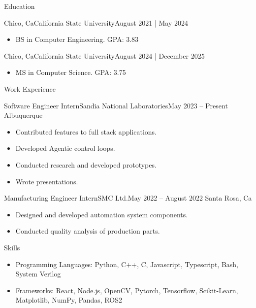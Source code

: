 \documentclass[]{mcdowellcv}
\begin{document}
\makeheader
      

\begin{cvsection}{Education}
	\begin{cvsubsection}{Chico, Ca}{California State University}{August 2021 | May 2024}
		\begin{itemize}
			\item BS in Computer Engineering. GPA: 3.83
		\end{itemize}
	\end{cvsubsection}
	\begin{cvsubsection}{Chico, Ca}{California State University}{August 2024 | December 2025}
		\begin{itemize}
			\item MS in Computer Science. GPA: 3.75
		\end{itemize}
	\end{cvsubsection}
\end{cvsection}
\begin{cvsection}{Work Experience}
	\begin{cvsubsection}{Software Engineer Intern}{Sandia National Laboratories}{May 2023 -- Present}
		Albuquerque
		\begin{itemize}%
			\item Contributed features to full stack applications.
			\item Developed Agentic control loops.
			\item Conducted research and developed prototypes.
			\item Wrote presentations.
		\end{itemize}
	\end{cvsubsection}
	\begin{cvsubsection}{Manufacturing Engineer Intern}{SMC Ltd.}{May 2022 -- August 2022}
		Santa Rosa, Ca
		\begin{itemize}%
			\item Designed and developed automation system components.
			\item Conducted quality analysis of production parts.
		\end{itemize}
	\end{cvsubsection}
\end{cvsection}
\begin{cvsection}{Skills}
	\begin{cvsubsection}{}{}{}
		\begin{itemize}
			\item Programming Languages:  Python, C++, C, Javascript, Typescript, Bash, System Verilog
			\item Frameworks:  React, Node.js, OpenCV, Pytorch, Tensorflow, Scikit-Learn, Matplotlib, NumPy, Pandas, ROS2
		\end{itemize}
	\end{cvsubsection}
\end{cvsection}
\end{document}
